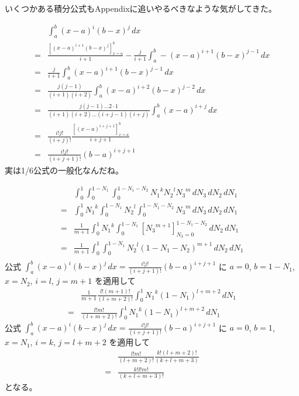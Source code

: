 いくつかある積分公式もAppendixに追いやるべきなような気がしてきた。

\begin{align}
&\int_a^b\left(x-a\right)^i\left(b-x\right)^j\,dx\\
=&\frac{\left[\left(x-a\right)^{i+1}\left(b-x\right)^j\right]_{x=a}^{b}}{i+1}
 - \frac{j}{i+1}\int_a^b-\left(x-a\right)^{i+1}\left(b-x\right)^{j-1}\,dx\\
=&\frac{j}{i+1}\int_a^b\left(x-a\right)^{i+1}\left(b-x\right)^{j-1}\,dx\\
=&\frac{j\left(j-1\right)}{\left(i+1\right)\left(i+2\right)}
  \int_a^b\left(x-a\right)^{i+2}\left(b-x\right)^{j-2}\,dx\\
=&\frac{j\left(j-1\right)\ldots2\cdot1}
       {\left(i+1\right)\left(i+2\right)
        \ldots\left(i+j-1\right)\left(i+j\right)}
  \int_a^b\left(x-a\right)^{i+j}\,dx\\
=&\frac{i!j!}{\left(i+j\right)!}
  \frac{\left[\left(x-a\right)^{i+j+1}\right]_{x=a}^b}
       {i+j+1}\\
=&\frac{i!j!}{\left(i+j+1\right)!}\left(b-a\right)^{i+j+1}
\end{align}
実は1/6公式の一般化なんだね。

\begin{align}
&\int_0^1\int_0^{1-N_1}\int_0^{1-N_1-N_2}
{N_1}^k{N_2}^l{N_3}^m
\,dN_3\,dN_2\,dN_1\\
=&
\int_0^1{N_1}^k\int_0^{1-N_1}{N_2}^l\int_0^{1-N_1-N_2}{N_3}^m
\,dN_3\,dN_2\,dN_1\\
=&
\frac{1}{m+1}
\int_0^1{N_1}^k\int_0^{1-N_1}
\left[{N_3}^{m+1}\right]_{N_3=0}^{1-N_1-N_2}
\,dN_2\,dN_1\\
=&\frac{1}{m+1}
\int_0^1\int_0^{1-N_1}
{N_2}^l\left(1-N_1-N_2\right)^{m+1}
\,dN_2\,dN_1\\
\end{align}
公式
$\displaystyle\int_a^b\left(x-a\right)^i\left(b-x\right)^j\,dx
=\frac{i!j!}{\left(i+j+1\right)!}\left(b-a\right)^{i+j+1}$
に
$a=0$, $b=1-N_1$, $x=N_2$, $i=l$, $j=m+1$
を適用して
\begin{align}
&\frac{1}{m+1}\frac{l!\left(m+1\right)!}{\left(l+m+2\right)!}
\int_0^1{N_1}^k
\left(1-N_1\right)^{l+m+2}
\,dN_1\\
=&\frac{l!m!}{\left(l+m+2\right)!}
\int_0^1{N_1}^k
\left(1-N_1\right)^{l+m+2}
\,dN_1
\end{align}
公式
$\displaystyle\int_a^b\left(x-a\right)^i\left(b-x\right)^j\,dx
=\frac{i!j!}{\left(i+j+1\right)!}\left(b-a\right)^{i+j+1}$
に
$a=0$, $b=1$, $x=N_1$, $i=k$, $j=l+m+2$
を適用して
\begin{align}
&\frac{l!m!}{\left(l+m+2\right)!}
\frac{k!\left(l+m+2\right)!}
     {\left(k+l+m+3\right)}\\
=&\frac{k!l!m!}{\left(k+l+m+3\right)!}
\end{align}
となる。